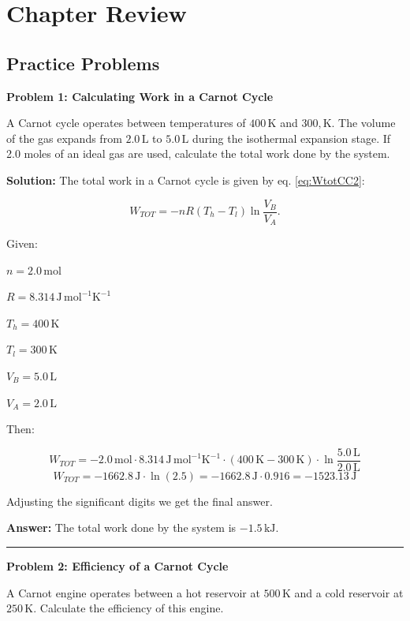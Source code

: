 \documentclass[
  9pt,
]{extbook}
\theoremstyle{definition}
\theoremstyle{definition}
\theoremstyle{definition}
\theoremstyle{definition}
\theoremstyle{remark}
\begin{document}
\section{Chapter Review}\label{rev5}

\subsection{Practice Problems}\label{exer5}

\textbf{Problem 1: Calculating Work in a Carnot Cycle}

A Carnot cycle operates between temperatures of \(400 \,\text{K}\) and \(300 ,\text{K}\). The volume of the gas expands from \(2.0\,\text{L}\) to \(5.0\,\text{L}\) during the isothermal expansion stage. If 2.0 moles of an ideal gas are used, calculate the total work done by the system.

\textbf{Solution:} The total work in a Carnot cycle is given by eq. \eqref{eq:WtotCC2}:

\[W_{TOT} = -nR(T_h - T_l)\ln\frac{V_B}{V_A}.\]

Given:

\(n = 2.0 \,\text{mol}\)

\(R = 8.314\,\text{J}\,\text{mol}^{-1}\text{K}^{-1}\)

\(T_h = 400\,\text{K}\)

\(T_l = 300\,\text{K}\)

\(V_B = 5.0\,\text{L}\)

\(V_A = 2.0\,\text{L}\)

Then:

\[W_{TOT} = -2.0 \,\text{mol} \cdot 8.314\,\text{J}\,\text{mol}^{-1}\text{K}^{-1} \cdot(400\,\text{K} - 300\,\text{K})\cdot \ln\frac{5.0\,\text{L}}{2.0\,\text{L}}\]
\[W_{TOT} = -1662.8\,\text{J} \cdot \ln(2.5) = -1662.8 \,\text{J} \cdot 0.916 = -1523.13\,\text{J}\]

Adjusting the significant digits we get the final answer.

\textbf{Answer:} The total work done by the system is \(-1.5 \,\text{kJ}\).

\begin{center}\rule{0.5\linewidth}{0.5pt}\end{center}

\textbf{Problem 2: Efficiency of a Carnot Cycle}

A Carnot engine operates between a hot reservoir at \(500\,\text{K}\) and a cold reservoir at \(250\,\text{K}\). Calculate the efficiency of this engine.
\end{document}
